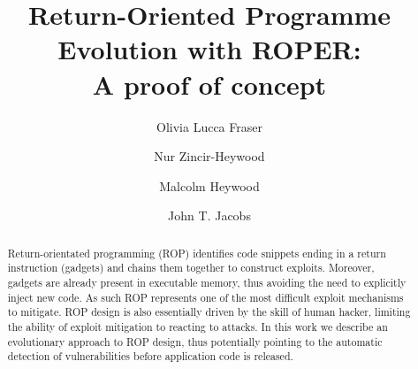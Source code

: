 \documentclass[sigconf]{acmart}
\begin{document}
\title{Return-Oriented Programme Evolution with ROPER:\\ A proof of concept}


\author{Olivia Lucca Fraser}

\author{Nur Zincir-Heywood}

\author{Malcolm Heywood}

\author{John T. Jacobs}


\renewcommand{\shortauthors}{O. Fraser et al.}
\renewcommand{\shorttitle}{Return-Oriented Programme Evolution with ROPER}


\begin{abstract}
Return-orientated programming (ROP) identifies code snippets ending in a return instruction (gadgets) and chains them together to construct exploits. Moreover, gadgets are already present in executable memory, thus avoiding the need to explicitly inject new code. As such ROP represents one of the most difficult exploit mechanisms to mitigate. ROP design is also essentially driven by the skill of human hacker, limiting the ability of exploit mitigation to reacting to attacks. In this work we describe an evolutionary approach to ROP design, thus potentially pointing to the automatic detection of vulnerabilities before application code is released.
\end{abstract}
\end{document}
